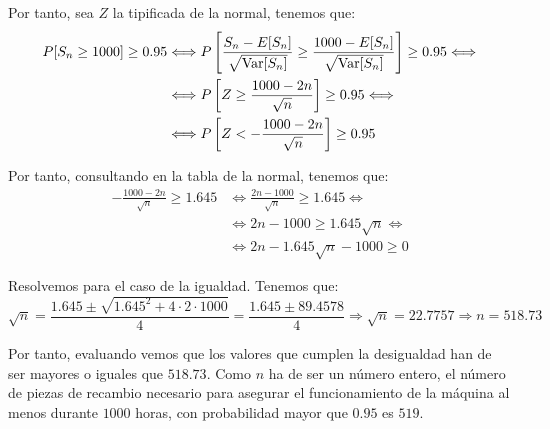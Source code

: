 \begin{ejercicio}
    Por tanto, sea $Z$ la tipificada de la normal, tenemos que:
    \begin{align*}
        P[S_{n} \geq 1000] \geq 0.95
        &\Longleftrightarrow P\left[\frac{S_{n}-E[S_n]}{\sqrt{\operatorname{Var}[S_{n}]}} \geq \frac{1000 - E[S_n]}{\sqrt{\operatorname{Var}[S_{n}]}}\right] \geq 0.95
        \Longleftrightarrow \\ & \Longleftrightarrow P\left[Z \geq \frac{1000 - 2n}{\sqrt{n}}\right] \geq 0.95
        \Longleftrightarrow \\ & \Longleftrightarrow P\left[Z < -\frac{1000 - 2n}{\sqrt{n}}\right] \geq 0.95
    \end{align*}

    Por tanto, consultando en la tabla de la normal, tenemos que:
    \begin{align*}
        -\frac{1000 - 2n}{\sqrt{n}} \geq 1.645
        &\Longleftrightarrow \frac{2n-1000}{\sqrt{n}} \geq 1.645
        \Longleftrightarrow \\&\Longleftrightarrow 2n-1000 \geq 1.645\sqrt{n}
        \Longleftrightarrow \\&\Longleftrightarrow 2n-1.645\sqrt{n}-1000 \geq 0
    \end{align*}

    Resolvemos para el caso de la igualdad. Tenemos que:
    \begin{equation*}
        \sqrt{n} = \frac{1.645\pm \sqrt{1.645^2+4\cdot 2\cdot 1000}}{4}
        = \frac{1.645\pm 89.4578}{4}
        \Longrightarrow
        \sqrt{n}=22.7757 \Longrightarrow n=518.73
    \end{equation*}

    Por tanto, evaluando vemos que los valores que cumplen la desigualdad han de ser mayores o iguales que $518.73$. Como $n$ ha de ser un número entero, el número de piezas de recambio necesario para asegurar el funcionamiento de la máquina al menos durante $1000$ horas, con probabilidad mayor que $0.95$ es $519$.
\end{ejercicio}
